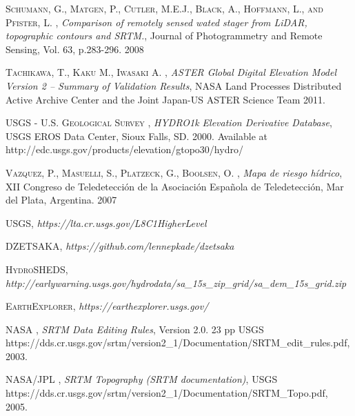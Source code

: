 \begin{thebibliography}{9}
 \textsc{Schumann, G., Matgen, P., Cutler, M.E.J., Black, A., Hoffmann, L., and Pfister, L.} , \textit{Comparison of remotely sensed wated stager from LiDAR, topographic contours and SRTM.}, Journal of Photogrammetry and Remote Sensing, Vol. 63, p.283-296. 2008

 \textsc{Tachikawa, T., Kaku M., Iwasaki A.} , \textit{ASTER Global Digital Elevation Model Version 2 – Summary of Validation Results},  NASA Land Processes Distributed Active Archive Center and the Joint Japan-US ASTER Science Team 2011.


 \textsc{USGS - U.S. Geological Survey} , \textit{HYDRO1k Elevation Derivative Database}, USGS EROS Data Center, Sioux Falls, SD. 2000. Available at http://edc.usgs.gov/products/elevation/gtopo30/hydro/


 \textsc{Vazquez, P., Masuelli, S., Platzeck, G., Boolsen, O.} , \textit{Mapa de riesgo hídrico}, XII Congreso de Teledetección de la Asociación Española de Teledetección, Mar del Plata, Argentina. 2007

 \textsc{USGS}, \textit{https://lta.cr.usgs.gov/L8C1HigherLevel}

 \textsc{DZETSAKA}, \textit{https://github.com/lennepkade/dzetsaka}

 \textsc{HydroSHEDS}, \textit{http://earlywarning.usgs.gov/hydrodata/sa\_15s\_zip\_grid/sa\_dem\_15s\_grid.zip}

 \textsc{EarthExplorer}, \textit{https://earthexplorer.usgs.gov/}

 \textsc{NASA} , \textit{SRTM Data Editing Rules}, Version 2.0. 23 pp USGS \\https://dds.cr.usgs.gov/srtm/version2\_1/Documentation/SRTM\_edit\_rules.pdf, 2003.

 \textsc{NASA/JPL} , \textit{SRTM Topography (SRTM documentation)}, USGS \\https://dds.cr.usgs.gov/srtm/version2\_1/Documentation/SRTM\_Topo.pdf, 2005.

\end{thebibliography}
